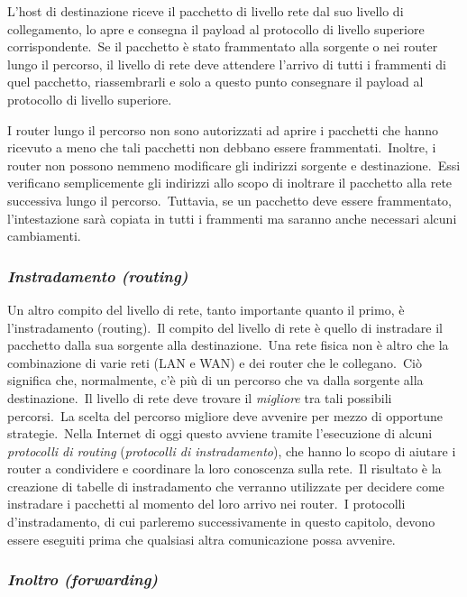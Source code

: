 L'host di destinazione riceve il pacchetto di livello rete dal suo livello di collegamento, lo apre e consegna il payload al protocollo di livello superiore corrispondente.\
Se il pacchetto è stato frammentato alla sorgente o nei router lungo il percorso, il livello di rete deve attendere l'arrivo di tutti i frammenti di quel pacchetto, riassembrarli e solo a questo punto consegnare il payload al protocollo di livello superiore.

I router lungo il percorso non sono autorizzati ad aprire i pacchetti che hanno ricevuto a meno che tali pacchetti non debbano essere frammentati.\
Inoltre, i router non possono nemmeno modificare gli indirizzi sorgente e destinazione.\
Essi verificano semplicemente gli indirizzi allo scopo di inoltrare il pacchetto alla rete successiva lungo il percorso.\
Tuttavia, se un pacchetto deve essere frammentato, l'intestazione sarà copiata in tutti i frammenti ma saranno anche necessari alcuni cambiamenti.

\subsubsection{\emph{Instradamento (routing)}}

Un altro compito del livello di rete, tanto importante quanto il primo, è l'instradamento (routing).\
Il compito del livello di rete è quello di instradare il pacchetto dalla sua sorgente alla destinazione.\
Una rete fisica non è altro che la combinazione di varie reti (LAN e WAN) e dei router che le collegano.\
Ciò significa che, normalmente, c'è più di un percorso che va dalla sorgente alla destinazione.\
Il livello di rete deve trovare il \emph{migliore} tra tali possibili percorsi.\
La scelta del percorso migliore deve avvenire per mezzo di opportune strategie.\
Nella Internet di oggi questo avviene tramite l'esecuzione di alcuni \emph{protocolli di routing} (\emph{protocolli di instradamento}), che hanno lo scopo di aiutare i router a condividere e coordinare la loro conoscenza sulla rete.\
Il risultato è la creazione di tabelle di instradamento che verranno utilizzate per decidere come instradare i pacchetti al momento del loro arrivo nei router.\
I protocolli d'instradamento, di cui parleremo successivamente in questo capitolo, devono essere eseguiti prima che qualsiasi altra comunicazione possa avvenire.

\subsubsection{\emph{Inoltro (forwarding)}}

